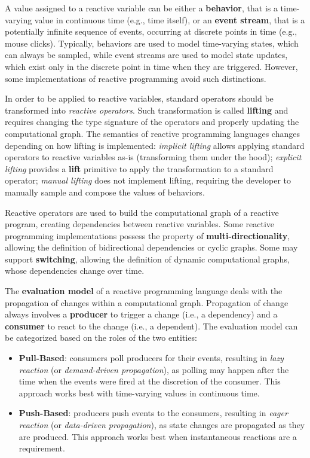 A value assigned to a reactive variable can be either a \textbf{behavior}, that
is a time-varying value in continuous time (e.g., time itself), or an
\textbf{event stream}, that is a potentially infinite sequence of events,
occurring at discrete points in time (e.g., mouse clicks). Typically, behaviors
are used to model time-varying states, which can always be sampled, while event
streams are used to model state updates, which exist only in the discrete point
in time when they are triggered. However, some implementations of reactive
programming avoid such distinctions.

In order to be applied to reactive variables, standard operators should be
transformed into \textit{reactive operators}. Such transformation is called
\textbf{lifting} and requires changing the type signature of the operators and
properly updating the computational graph. The semantics of reactive
programming languages changes depending on how lifting is implemented:
\textit{implicit lifting} allows applying standard operators to reactive
variables as-is (transforming them under the hood); \textit{explicit lifting}
provides a \textbf{lift} primitive to apply the transformation to a standard
operator; \textit{manual lifting} does not implement lifting, requiring the
developer to manually sample and compose the values of behaviors.

Reactive operators are used to build the computational graph of a reactive
program, creating dependencies between reactive variables. Some reactive
programming implementations possess the property of
\textbf{multi-directionality}, allowing the definition of bidirectional
dependencies or cyclic graphs. Some may support \textbf{switching}, allowing
the definition of dynamic computational graphs, whose dependencies change over
time.

The \textbf{evaluation model} of a reactive programming language deals with the
propagation of changes within a computational graph. Propagation of change
always involves a \textbf{producer} to trigger a change (i.e., a dependency)
and a \textbf{consumer} to react to the change (i.e., a dependent). The
evaluation model can be categorized based on the roles of the two entities:
\begin{itemize}
  \item \textbf{Pull-Based}: consumers poll producers for their events,
        resulting in \textit{lazy reaction} (or \textit{demand-driven propagation}),
        as polling may happen after the time when the events were fired at the
        discretion of the consumer. This approach works best with time-varying
        values in continuous time.
  \item \textbf{Push-Based}: producers push events to the consumers, resulting
        in \textit{eager reaction} (or \textit{data-driven propagation}), as
        state changes are propagated as they are produced. This approach works
        best when instantaneous reactions are a requirement.
\end{itemize}


